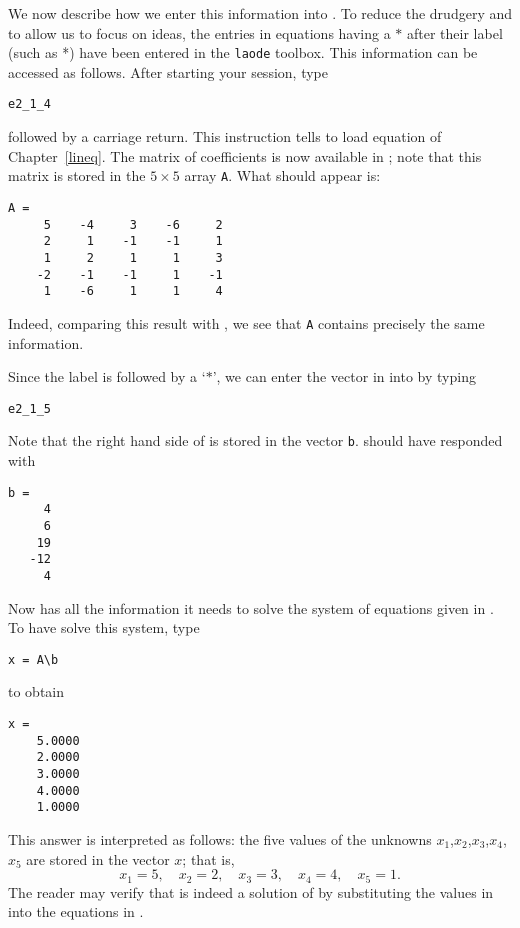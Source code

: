 \documentclass{ximera}
\begin{document}
We now describe how we enter this information into \Matlabp.  To
reduce the drudgery and to allow us to focus on ideas, the entries
in equations having a $*$ after their label
(such as *) have been entered in the {\tt laode}
toolbox. This information can be accessed as follows.  After
starting your \Matlab session, type
\begin{verbatim}
e2_1_4
\end{verbatim}
followed by a carriage return.  This instruction tells \Matlab to
load equation  of Chapter~\ref{lineq}.  The matrix of
coefficients is now available in \Matlabp; note that this matrix is
stored in the $5\times 5$ array {\tt A}.  What should appear is:
\begin{verbatim}
A =
     5    -4     3    -6     2
     2     1    -1    -1     1
     1     2     1     1     3
    -2    -1    -1     1    -1
     1    -6     1     1     4
\end{verbatim}
Indeed, comparing this result with , we see that
{\tt A} contains precisely the same information.

Since the label  is followed by a `$*$', we can enter
the vector in  into \Matlab by typing
\begin{verbatim}
e2_1_5
\end{verbatim}
Note that the right hand side of  is stored in the vector {\tt b}.
\Matlab should have responded with
\begin{verbatim}
b =
     4
     6
    19
   -12
     4
\end{verbatim}
Now \Matlab has all the information it needs to solve the system
of equations given in .  To have \Matlab solve this
system, type
\begin{verbatim}
x = A\b
\end{verbatim}
\index{\computer!$\backslash$}to obtain
\begin{verbatim}
x =
    5.0000
    2.0000
    3.0000
    4.0000
    1.0000
\end{verbatim}
This answer is interpreted as follows: the five values of the
unknowns $x_1$,$x_2$,$x_3$,$x_4$,$x_5$ are stored in the vector
$x$; that is,
\begin{equation} \label{answer1}
 x_1 = 5,\quad x_2 = 2,\quad x_3 = 3,\quad x_4 = 4,\quad x_5 = 1.
\end{equation}
The reader may verify that  is indeed a solution of
 by substituting the values in  into the
equations in .
\end{document}

